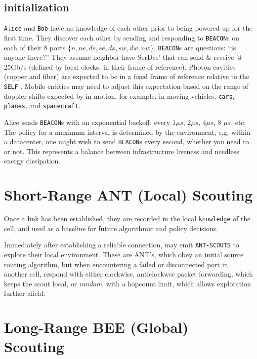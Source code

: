 \documentclass[../HFT-main.tex]{subfiles}
\begin{document}
\newpage


\subsection{\LINK initialization}


\texttt{Alice} and \texttt{Bob} have no knowledge of each other prior to being powered up for the first time. They discover each other by sending and responding to \texttt{BEACON}s on each of their 8 ports $\{n,ne,de,se,ds,sw,dw,nw\}$. \texttt{BEACON}s are questions: ``is anyone there?'' They assume  neighbor \CELLs have SerDes' that can send \& receive @ 25Gb/s (defined by local clocks, in their frame of reference). Photon cavities (copper and fiber) are expected to be in a fixed frame of reference relative to the \texttt{SELF} \CELL.  Mobile entities may need to adjust this expectation based on the range of doppler shifts expected by \CELLs in motion, for example, in moving vehicles, \texttt{cars}, \texttt{planes}, and \texttt{spacecraft}.


Alice sends \texttt{BEACON}s with an exponential backoff: every $1\mu s$, $2 \mu s$, $4 \mu s$, 8 $\mu s$, etc. The  policy for a maximum interval  is determined by the environment, e.g. within a datacenter, one might wish to send  \texttt{BEACON}s every second, whether you need to or not.  This  represents a balance between infrastructure liveness and needless energy dissipation.

\section{Short-Range ANT (Local)  Scouting}

Once a link has been established, they are recorded in the local \texttt{knowledge} of the cell, and used as a baseline for future algorithmic and policy decisions. 

Immediately after establishing a reliable connection, \CELLs may emit \texttt{ANT-SCOUTS} to explore their local environment. These are ANT's, which obey an initial source routing algorithm, but when encountering a failed or disconnected port in another cell, respond with either clockwise, anticlockwse packet forwarding, which keeps the scout local, or \emph{random}, with a hopcount limit, which allows exploration further afield.

\section{Long-Range BEE (Global)  Scouting}
\end{document}
